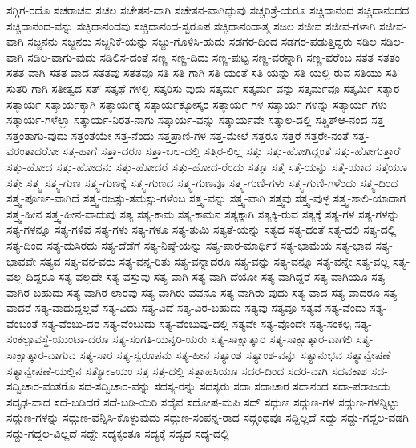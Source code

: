 {ಸಗ್ಗಿಗ-ರದೊ
ಸಚರಾಚವ
ಸಚಲ
ಸಚೇತನ-ವಾಗಿ
ಸಚೇತನ-ವಾಗಿದ್ದುವು
ಸಚ್ಚರಿತ್ರೆ-ಯರೂ
ಸಚ್ಚಿದಾನಂದ
ಸಚ್ಚಿದಾನಂದದ
ಸಚ್ಚಿದಾನಂದ-ವನ್ನು
ಸಚ್ಚಿದಾನಂದವು
ಸಚ್ಚಿದಾನಂದ-ಸ್ವರೂಪ
ಸಚ್ಚಿದಾನಂದಾತ್ಮ
ಸಜಲ
ಸಜೀವ
ಸಜೀವ-ಗಳಾಗಿ
ಸಜೀವ-ವಾಗಿ
ಸಜ್ಜನನು
ಸಜ್ಜನರು
ಸಜ್ಜನಿಕೆ-ಯನ್ನು
ಸಜ್ಜು-ಗೊಳಿಸಿ-ಹುದು
ಸಡಗರ-ದಿಂದ
ಸಡಗರ-ಪಡುತ್ತಿದ್ದರು
ಸಡಿಲ
ಸಡಿಲ-ವಾಗಿ
ಸಡಿಲ-ವಾಗು-ವುದು
ಸಡಿಲಿಸ-ದಂತೆ
ಸಣ್ಣ
ಸಣ್ಣ-ದಿದು
ಸಣ್ಣ-ಪುಟ್ಟ
ಸಣ್ಣ-ವರನ್ನಾಗಿ
ಸಣ್ಣ-ವರೆಂಬ
ಸತತ
ಸತತಂ
ಸತತ-ವಾಗಿ
ಸತತ-ವಾದ
ಸತತವು
ಸತತವೂ
ಸತಿ
ಸತಿ-ಗಾಗಿ
ಸತಿ-ಯಂತೆ
ಸತಿ-ಯನ್ನು
ಸತಿ-ಯಲ್ಲಿ-ರುವ
ಸತಿಯು
ಸತಿ-ಸುತರಿ-ಗಾಗಿ
ಸತೀತ್ವದ
ಸತ್
ಸತ್ಕಥೆ-ಗಳಲ್ಲಿ
ಸತ್ಕರಿಸು-ವುದು
ಸತ್ಕರ್ಮ
ಸತ್ಕರ್ಮ-ವನ್ನು
ಸತ್ಕರ್ಮವೂ
ಸತ್ಕರ್ಮಿ
ಸತ್ಕಾರ
ಸತ್ಕಾರ್ಯ
ಸತ್ಕಾರ್ಯಕ್ಕಾಗಿ
ಸತ್ಕಾರ್ಯಕ್ಕೆ
ಸತ್ಕಾರ್ಯಕ್ಕೋಸ್ಕರ
ಸತ್ಕಾರ್ಯ-ಗಳ
ಸತ್ಕಾರ್ಯ-ಗಳನ್ನು
ಸತ್ಕಾರ್ಯ-ಗಳು
ಸತ್ಕಾರ್ಯ-ಗಳೆಲ್ಲಾ
ಸತ್ಕಾರ್ಯ-ನಿರತ-ನಾಗು
ಸತ್ಕಾರ್ಯ-ವನ್ನು
ಸತ್ಕಾರ್ಯವೇ
ಸತ್ಕಾಲ-ದಲ್ಲಿ
ಸತ್ಚಿತ್ಆ-ನಂದ
ಸತ್ತ
ಸತ್ತಂತಾಗು-ವುದು
ಸತ್ತಂತೆಯೇ
ಸತ್ತ-ನೆಂದು
ಸತ್ತಪ್ರಾಣಿ-ಗಳ
ಸತ್ತ-ಮೇಲೆ
ಸತ್ತರೂ
ಸತ್ತರೆ
ಸತ್ತರೇ-ನಂತೆ
ಸತ್ತ-ವರಂತಾದರೋ
ಸತ್ತ-ಹಾಗೆ
ಸತ್ತಾ-ದರೂ
ಸತ್ತಾ-ಬಲ-ದಲ್ಲಿ
ಸತ್ತಿರ-ಲಿಲ್ಲ
ಸತ್ತು
ಸತ್ತು-ಹೋಗಿದ್ದಂತೆ
ಸತ್ತು-ಹೋಗುತ್ತಾರೆ
ಸತ್ತು-ಹೋದ
ಸತ್ತು-ಹೋದನು
ಸತ್ತು-ಹೋದರೆ
ಸತ್ತು-ಹೋದ-ರೆಂದು
ಸತ್ತೂ
ಸತ್ತೆ
ಸತ್ತೆ-ಯನ್ನು
ಸತ್ತೆ-ಯಾದ
ಸತ್ತೆಯೂ
ಸತ್ತೇ
ಸತ್ತ್ವ
ಸತ್ತ್ವ-ಗುಣ
ಸತ್ತ್ವ-ಗುಣಕ್ಕೆ
ಸತ್ತ್ವ-ಗುಣದ
ಸತ್ತ್ವ-ಗುಣವೂ
ಸತ್ತ್ವ-ಗುಣಿ-ಗಳು
ಸತ್ತ್ವ-ಗುಣಿ-ಗಳೆಂದು
ಸತ್ತ್ವ-ದಿಂದ
ಸತ್ತ್ವ-ಪೂರ್ಣ-ವಾಗಿದೆ
ಸತ್ತ್ವ-ರಜಸ್ಸು-ತಮಸ್ಸು-ಗಳೆಂಬ
ಸತ್ತ್ವ-ವನ್ನು
ಸತ್ತ್ವ-ವಾಗಿ
ಸತ್ತ್ವವು
ಸತ್ತ್ವ-ವುಳ್ಳ
ಸತ್ತ್ವ-ಶಾಲಿ-ಯಾದಾಗ
ಸತ್ತ್ವ-ಹೀನ
ಸತ್ತ್ವ-ಹೀನ-ವಾದುವು
ಸತ್ಯ
ಸತ್ಯ-ಕಾಮ
ಸತ್ಯ-ಕಾಮನ
ಸತ್ಯಕ್ಕಾಗಿ
ಸತ್ಯಕ್ಕಿ-ರುವ
ಸತ್ಯಕ್ಕೆ
ಸತ್ಯ-ಗಳ
ಸತ್ಯ-ಗಳನ್ನು
ಸತ್ಯ-ಗಳನ್ನೂ
ಸತ್ಯ-ಗಳಿವೆ
ಸತ್ಯ-ಗಳು
ಸತ್ಯ-ಗಳೂ
ಸತ್ಯ-ತುಮಿ
ಸತ್ಯತೆ-ಯನ್ನು
ಸತ್ಯದ
ಸತ್ಯ-ದಂತೆ
ಸತ್ಯ-ದಲಿ
ಸತ್ಯ-ದಲ್ಲಿ
ಸತ್ಯ-ದಿಂದ
ಸತ್ಯ-ದುಸಿರದು
ಸತ್ಯ-ದೆಡೆಗೆ
ಸತ್ಯ-ನಿಷ್ಠೆ-ಯನ್ನು
ಸತ್ಯ-ಪಾರ-ಮಾರ್ಥಿಕ
ಸತ್ಯ-ಭಾಮೆಯ
ಸತ್ಯ-ಭಾವ
ಸತ್ಯ-ಭಾವವೇ
ಸತ್ಯವ
ಸತ್ಯ-ವನ-ವರು
ಸತ್ಯ-ವನ್ನ-ರಿತು
ಸತ್ಯ-ವನ್ನಾದರೂ
ಸತ್ಯ-ವನ್ನು
ಸತ್ಯ-ವನ್ನೂ
ಸತ್ಯ-ವನ್ನೇ
ಸತ್ಯ-ವಲ್ಲ
ಸತ್ಯ-ವಲ್ಲ-ದಿದ್ದರೂ
ಸತ್ಯ-ವಲ್ಲದೇ
ಸತ್ಯ-ವಸ್ತುವು
ಸತ್ಯ-ವಾಗಿ
ಸತ್ಯ-ವಾಗಿ-ದೆಯೋ
ಸತ್ಯ-ವಾಗಿದ್ದರೆ
ಸತ್ಯ-ವಾಗಿಯೂ
ಸತ್ಯ-ವಾಗಿರ-ಬಹುದು
ಸತ್ಯ-ವಾಗಿರ-ಲಾರವು
ಸತ್ಯ-ವಾಗಿರು-ವವನೂ
ಸತ್ಯ-ವಾಗಿರು-ವುದು
ಸತ್ಯ-ವಾದ
ಸತ್ಯ-ವಾದರೂ
ಸತ್ಯ-ವಾದರೆ
ಸತ್ಯ-ವಾದುದ್ದಲ್ಲವೆ
ಸತ್ಯ-ವಿದು
ಸತ್ಯ-ವಿದೆ
ಸತ್ಯ-ವಿರ-ಬಹುದು
ಸತ್ಯವು
ಸತ್ಯವೂ
ಸತ್ಯವೆ
ಸತ್ಯ-ವೆಂದು
ಸತ್ಯ-ವೆಂಬಂತೆ
ಸತ್ಯ-ವೆಂಬು-ದರ
ಸತ್ಯ-ವೆಂಬುದು
ಸತ್ಯ-ವೆಂಬುವು-ದಲ್ಲಿ
ಸತ್ಯವೇ
ಸತ್ಯ-ವೊಂದೇ
ಸತ್ಯ-ಸಂಕಲ್ಪ
ಸತ್ಯ-ಸಂಕಲ್ಪಾವಸ್ಥೆ-ಯುಂಟಾ-ದರೂ
ಸತ್ಯ-ಸಂಗತಿ-ಯನ್ನರಿ-ಯರು
ಸತ್ಯ-ಸಾಕ್ಷಾತ್ಕಾರ
ಸತ್ಯ-ಸಾಕ್ಷಾತ್ಕಾರ-ವಾಗಲಿ
ಸತ್ಯ-ಸಾಕ್ಷಾತ್ಕಾರ-ವಾಗುವ
ಸತ್ಯ-ಸಾರ
ಸತ್ಯ-ಸ್ವರೂಪನು
ಸತ್ಯ-ಹೀನ
ಸತ್ಯಾಂಶ
ಸತ್ಯಾಂಶ-ವನ್ನು
ಸತ್ಯಾನುಭವ
ಸತ್ಯಾನ್ವೇಷಣೆ
ಸತ್ಯಾನ್ವೇಷಣೆ-ಯಲ್ಲಿನ
ಸತ್ಯೋಽಯಂ
ಸತ್ರ
ಸತ್ರ-ದಲ್ಲಿ
ಸತ್ಸಾಹಸಿಯೂ
ಸದರ-ದಿಂದ
ಸದರ-ವಾಗಿ
ಸದವಕಾಶ
ಸದ-ಸದ್ವಿಚಾರ-ವಂತರೊ
ಸದ-ಸದ್ವಿಚಾರ-ವನ್ನು
ಸದಸ್ಯ-ರನ್ನು
ಸದಸ್ಯರು
ಸದಾ
ಸದಾಚಾರ
ಸದಾನಂದ
ಸದಾ-ಪರಾಜಯ
ಸದೃಢ-ವಾದ
ಸದೆ-ಬಡಿದರೆ
ಸದೆ-ಬಡಿ-ಯಿರಿ
ಸದೈವ
ಸದೋಷ-ಮಪಿ
ಸದ್
ಸದ್ಗುಣ
ಸದ್ಗುಣ-ಗಳ
ಸದ್ಗುಣ-ಗಳನ್ನಿಟ್ಟು
ಸದ್ಗುಣ-ಗಳನ್ನು
ಸದ್ಗುಣ-ವೆನ್ನಿಸಿ-ಕೊಳ್ಳುವುದು
ಸದ್ಗುಣ-ಸಂಪನ್ನ-ರಾದ
ಸದ್ಗ್ರಂಥವೂ
ಸದ್ದಿಲ್ಲದೆ
ಸದ್ದು
ಸದ್ದು-ಗದ್ದಲ-ವಡಗಿ
ಸದ್ದು-ಗದ್ದಲ-ವಿಲ್ಲದೆ
ಸದ್ದೇ
ಸದ್ಯಕ್ಕಂತೂ
ಸದ್ಯಕ್ಕೆ
ಸದ್ಯದ
ಸದ್ಯ-ದಲ್ಲಿ
}
